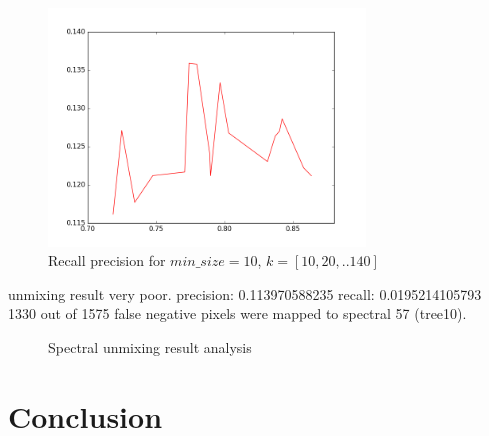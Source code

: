 \documentclass[12pt,twoside]{article}
\theoremstyle{plain}
\theoremstyle{definition}
\theoremstyle{remark}
\begin{document}
\begin{figure}[hbtp]
\centering
\includegraphics[width=0.75\textwidth]{src/rec_prec_sad.png}
\caption{Recall precision for $min\_size=10$, $k=[10,20,..140]$ }
\label{fig:rec_prec_sad}
\end{figure}

unmixing result very poor.
precision:  0.113970588235
recall:  0.0195214105793
1330 out of 1575 false negative pixels were mapped to spectral 57 (tree10).

\begin{figure}[htbp]
\centering     %
{}
\caption{Spectral unmixing result analysis}
\end{figure}

\section{Conclusion}
\label{sec:concl}
%
%


\end{document}
